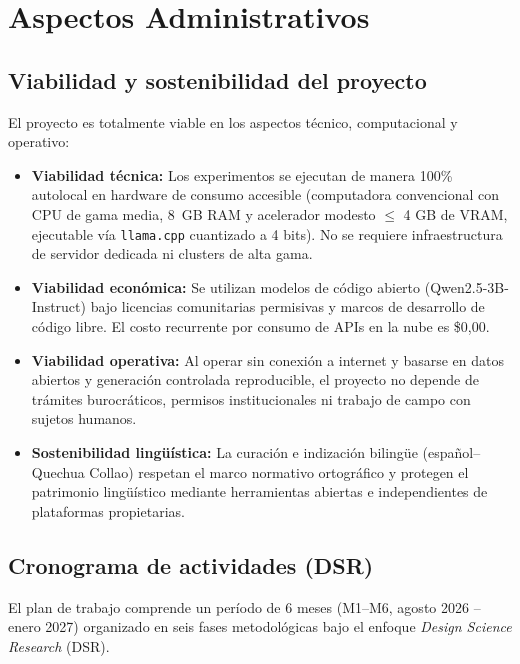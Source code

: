 \newpage
\section{Aspectos Administrativos}

\subsection{Viabilidad y sostenibilidad del proyecto}

El proyecto es totalmente viable en los aspectos técnico, computacional y operativo:

\begin{itemize}
  \item \textbf{Viabilidad técnica:} Los experimentos se ejecutan de manera 100\% autolocal en hardware de consumo accesible (computadora convencional con CPU de gama media, 8~GB RAM y acelerador modesto $\le$ 4 GB de VRAM, ejecutable vía \texttt{llama.cpp} cuantizado a 4 bits). No se requiere infraestructura de servidor dedicada ni clusters de alta gama.
  \item \textbf{Viabilidad económica:} Se utilizan modelos de código abierto (Qwen2.5-3B-Instruct) bajo licencias comunitarias permisivas y marcos de desarrollo de código libre. El costo recurrente por consumo de APIs en la nube es \$0,00.
  \item \textbf{Viabilidad operativa:} Al operar sin conexión a internet y basarse en datos abiertos y generación controlada reproducible, el proyecto no depende de trámites burocráticos, permisos institucionales ni trabajo de campo con sujetos humanos.
  \item \textbf{Sostenibilidad lingüística:} La curación e indización bilingüe (español--Quechua Collao) respetan el marco normativo ortográfico y protegen el patrimonio lingüístico mediante herramientas abiertas e independientes de plataformas propietarias.
\end{itemize}

\subsection{Cronograma de actividades (DSR)}

El plan de trabajo comprende un período de 6 meses (M1--M6, agosto 2026 -- enero 2027) organizado en seis fases metodológicas bajo el enfoque \textit{Design Science Research} (DSR).

